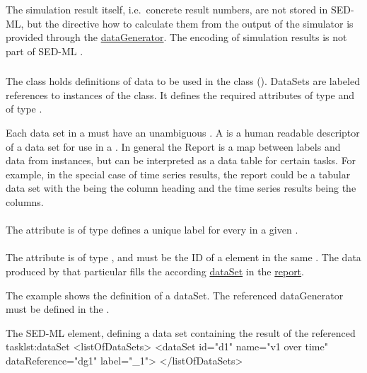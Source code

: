 The simulation result itself, i.e.\ concrete result numbers, are not stored in SED-ML, but the directive how to calculate them from the output of the simulator is provided through the \hyperref[class:dataGenerator]{dataGenerator}. The encoding of simulation results is not part of SED-ML \currentLV.

\begin{blockChanged}
\subsubsection{}
\label{class:dataSet}
The \DataSet class holds definitions of data to be used in the \Report class (). DataSets are labeled references to instances of the \DataGenerator class.  It defines the required attributes  of type  and  of type \SIdRef.  

Each data set in a \Report must have an unambiguous . A  is a human readable descriptor of a data set for use in a \Report.  In general the Report is a map between labels and data from \DataGenerator instances, but can be interpreted as a data table for certain tasks. For example, in the special case of time series results, the report could be a tabular data set with the  being the column heading and the time series results being the columns.

\paragraph*{}
\label{sec:label}
The  attribute is of type  defines a unique label for every \DataSet in a given \Report.

\paragraph*{}
\label{sec:dataReference}
The  attribute is of type \SIdRef, and must be the ID of a \DataGenerator element in the same \SedDocument.  The data produced by that particular \DataGenerator fills the according \hyperref[class:dataSet]{dataSet} in the \hyperref[class:report]{report}.

The example shows the definition of a dataSet. The referenced dataGenerator  must be defined in the \hyperref[class:listOfDataGenerators]{}.
\begin{myXmlLst}{The SED-ML  element, defining a data set containing the result of the referenced task}{lst:dataSet}
<listOfDataSets>
	<dataSet id="d1" name="v1 over time" dataReference="dg1" label="_1">
</listOfDataSets>
\end{myXmlLst}


\end{blockChanged}
